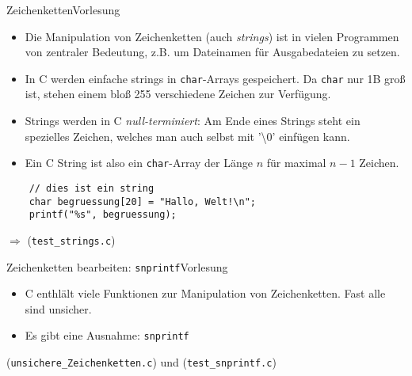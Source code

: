\documentclass[xcolor=dvipsnames]{beamer}
\newcounter{lecturecounter}
\begin{document}
\begin{frame}[fragile]{Zeichenketten}{Vorlesung }
  \begin{block}{}
    \begin{itemize}
      \item{Die Manipulation von Zeichenketten (auch \emph{strings}) ist in vielen Programmen von zentraler Bedeutung, z.B. um Dateinamen für Ausgabedateien zu setzen.}
      \item{In C werden einfache strings in \texttt{char}-Arrays gespeichert. Da \texttt{char} nur 1B groß ist, stehen einem bloß 255 verschiedene Zeichen zur Verfügung.}
      \item{Strings werden in C \emph{null-terminiert}: Am Ende eines Strings steht ein spezielles Zeichen, welches man auch selbst mit '\textbackslash 0' einfügen kann.}
      \item{Ein C String ist also ein \texttt{char}-Array der Länge $n$ für maximal $n-1$ Zeichen.}
    \end{itemize}
  \end{block}
  \begin{lstlisting}
    // dies ist ein string
    char begruessung[20] = "Hallo, Welt!\n";
    printf("%s", begruessung);
  \end{lstlisting}
  $\Rightarrow$ (\verb|test_strings.c|)
\end{frame}

\begin{frame}[fragile]{Zeichenketten bearbeiten: \texttt{snprintf}}{Vorlesung }
  \begin{block}{}
    \begin{itemize}
      \item{C enthlält viele Funktionen zur Manipulation von Zeichenketten. Fast alle sind unsicher.}
      \item{Es gibt eine Ausnahme: \texttt{snprintf}}
    \end{itemize}
  \end{block}
  (\verb|unsichere_Zeichenketten.c|)  und (\verb|test_snprintf.c|)
\end{frame}
\end{document}
